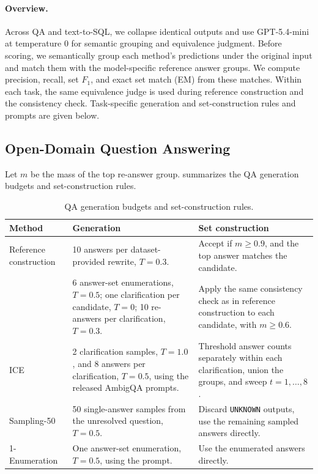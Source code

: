 \paragraph{Overview.}
Across QA and text-to-SQL, we collapse identical outputs and use GPT-5.4-mini at temperature 0 for semantic grouping and equivalence judgment. Before scoring, we semantically group each method's predictions under the original input and match them with the model-specific reference answer groups. We compute precision, recall, set $F_1$, and exact set match (EM) from these matches. Within each task, the same equivalence judge is used during reference construction and the \circleclar{} consistency check. Task-specific generation and set-construction rules and prompts are given below.

\subsection{Open-Domain Question Answering}
 Let $m$ be the mass of the top re-answer group.  summarizes the QA generation budgets and set-construction rules.

\begin{table}[t]
    \centering
    \caption{QA generation budgets and set-construction rules.}
    \label{tab:qa-frozen-configuration}
    \vspace{3pt}
    \small
    \setlength{\tabcolsep}{3pt}
    \renewcommand{\arraystretch}{1.10}
    \begin{tabularx}{\columnwidth}{@{}p{}p{}X@{}}
        \toprule
        \textbf{Method} & \textbf{Generation} & \textbf{Set construction} \\
        \midrule
        Reference construction
        & 10 answers per dataset-provided rewrite, $T=0.3$.
        & Accept if $m\geq0.9$, and the top answer matches the candidate. \\
        \midrule

        \circleclar{}
        & 6 answer-set enumerations, $T=0.5$; one clarification per candidate,
          $T=0$; 10 re-answers per clarification, $T=0.3$.
        & Apply the same consistency check as in reference construction to each
          candidate, with $m\geq0.6$. \\

        ICE
        & 2 clarification samples, $T=1.0$, and 8 answers per clarification, $T=0.5$,
          using the released AmbigQA prompts.
        & Threshold answer counts separately within each clarification, union the groups, and sweep $t=1,\ldots,8$. \\

        Sampling-50
        & 50 single-answer samples from the unresolved question, $T=0.5$.
        & Discard \texttt{UNKNOWN} outputs, use the remaining sampled answers directly. \\

        1-Enumeration
        & One answer-set enumeration, $T=0.5$, using the \circleclar{} prompt.
        & Use the enumerated answers directly. \\
        \bottomrule
    \end{tabularx}
\end{table}

